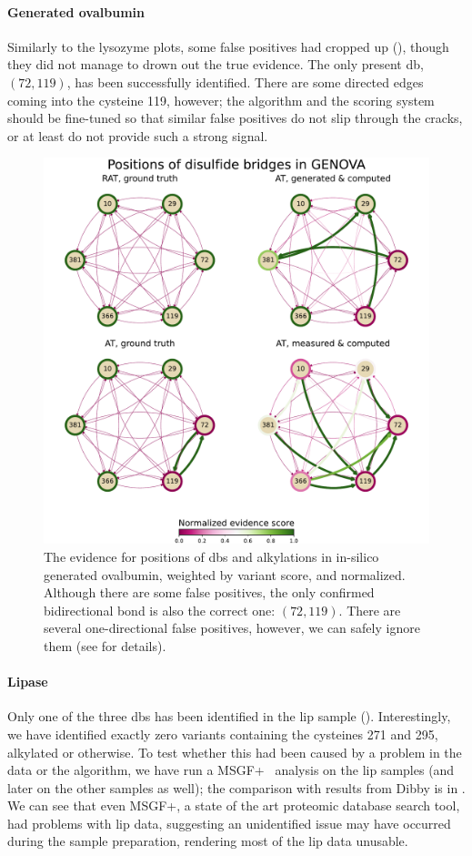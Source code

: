 \paragraph{Generated ovalbumin} Similarly to the lysozyme plots, some false positives had cropped up (), though they did not manage to drown out the true evidence. The only present \gls*{db}, \((72, 119)\), has been successfully identified. There are some directed edges coming into the cysteine 119, however; the algorithm and the scoring system should be fine-tuned so that similar false positives do not slip through the cracks, or at least do not provide such a strong signal.

\begin{figure}
  \centering
  \includegraphics[width=0.9\linewidth]{img/pdfa-genova.pdf}
  \caption{The evidence for positions of \glspl*{db} and alkylations in in-silico generated ovalbumin, weighted by variant score, and normalized. Although there are some false positives, the only confirmed bidirectional bond is also the correct one: \((72, 119)\). There are several one-directional false positives, however, we can safely ignore them (see  for details).}\label{fig:genova}
\end{figure}

\paragraph{Lipase} Only one of the three \glspl*{db} has been identified in the \gls*{lip} sample (). Interestingly, we have identified exactly zero variants containing the cysteines 271 and 295, alkylated or otherwise. To test whether this had been caused by a problem in the data or the algorithm, we have run a MSGF+~\cite{kim2014ms} analysis on the \gls*{lip} samples (and later on the other samples as well); the comparison with results from Dibby is in . We can see that even MSGF+, a state of the art proteomic database search tool, had problems with \gls*{lip} data, suggesting an unidentified issue may have occurred during the sample preparation, rendering most of the \gls*{lip} data unusable.

